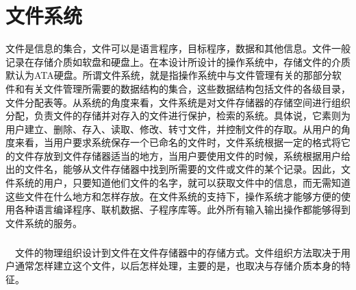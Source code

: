\documentclass[UTF8,nofonts,cs4size]{ctexrep}
\begin{document}
\chapter{文件系统}
文件是信息的集合，文件可以是语言程序，目标程序，数据和其他信息。文件一般记录在存储介质如软盘和硬盘上。在本设计所设计的操作系统中，存储文件的介质默认为ATA硬盘。所谓文件系统，就是指操作系统中与文件管理有关的那部分软件和有关文件管理所需要的数据结构的集合，这些数据结构包括文件的各级目录，文件分配表等。从系统的角度来看，文件系统是对文件存储器的存储空间进行组织分配，负责文件的存储并对存入的文件进行保护，检索的系统。具体说，它素则为用户建立、删除、存入、读取、修改、转寸文件，并控制文件的存取。从用户的角度来看，当用户要求系统保存一个已命名的文件时，文件系统根据一定的格式将它的文件存放到文件存储器适当的地方，当用户要使用文件的时候，系统根据用户给出的文件名，能够从文件存储器中找到所需要的文件或文件的某个记录。因此，文件系统的用户，只要知道他们文件的名字，就可以获取文件中的信息，而无需知道这些文件在什么地方和怎样存放。在文件系统的支持下，操作系统才能够方便的使用各种语言编译程序、联机数据、子程序库等。此外所有输入输出操作都能够得到文件系统的服务。
\paragraph{}
\indent \ \ 文件的物理组织设计到文件在文件存储器中的存储方式。文件组织方法取决于用户通常怎样建立这个文件，以后怎样处理，主要的是，也取决与存储介质本身的特征。
\end{document}
